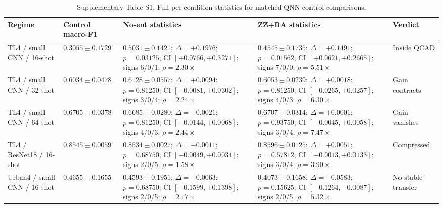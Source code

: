 \begin{table}[!t]
\centering
\scriptsize
\caption{Supplementary Table S1. Full per-condition statistics for matched QNN-control comparisons.}
\label{tab:supp_full_stats}
\setlength{\tabcolsep}{2.5pt}
\renewcommand{\arraystretch}{1.12}
\begin{tabular}{@{}p{}p{}p{}p{}p{}@{}}
\toprule
Regime & Control macro-F1 & No-ent statistics & ZZ+RA statistics & Verdict \\
\midrule
TL4 / small CNN / 16-shot & $0.3055\pm0.1729$ & $0.5031\pm0.1421$; $\Delta=+0.1976$; $p=0.03125$; CI $[+0.0766,+0.3271]$; signs 6/0/1; $\rho=2.30\times$ & $0.4545\pm0.1735$; $\Delta=+0.1491$; $p=0.01562$; CI $[+0.0621,+0.2665]$; signs 7/0/0; $\rho=5.51\times$ & Inside QCAD \\
TL4 / small CNN / 32-shot & $0.6034\pm0.0478$ & $0.6128\pm0.0557$; $\Delta=+0.0094$; $p=0.81250$; CI $[-0.0081,+0.0302]$; signs 3/0/4; $\rho=2.24\times$ & $0.6053\pm0.0239$; $\Delta=+0.0018$; $p=0.81250$; CI $[-0.0265,+0.0257]$; signs 4/0/3; $\rho=6.30\times$ & Gain contracts \\
TL4 / small CNN / 64-shot & $0.6705\pm0.0378$ & $0.6685\pm0.0280$; $\Delta=-0.0021$; $p=0.81250$; CI $[-0.0144,+0.0068]$; signs 4/0/3; $\rho=2.44\times$ & $0.6707\pm0.0314$; $\Delta=+0.0001$; $p=0.93750$; CI $[-0.0045,+0.0058]$; signs 3/0/4; $\rho=7.47\times$ & Gain vanishes \\
TL4 / ResNet18 / 16-shot & $0.8545\pm0.0059$ & $0.8534\pm0.0027$; $\Delta=-0.0011$; $p=0.68750$; CI $[-0.0049,+0.0034]$; signs 2/0/5; $\rho=1.58\times$ & $0.8596\pm0.0125$; $\Delta=+0.0051$; $p=0.57812$; CI $[-0.0013,+0.0133]$; signs 3/0/4; $\rho=3.90\times$ & Compressed \\
Urban4 / small CNN / 16-shot & $0.4655\pm0.1655$ & $0.4593\pm0.1951$; $\Delta=-0.0063$; $p=0.68750$; CI $[-0.1599,+0.1398]$; signs 2/0/5; $\rho=2.17\times$ & $0.4073\pm0.1658$; $\Delta=-0.0583$; $p=0.15625$; CI $[-0.1264,-0.0087]$; signs 2/0/5; $\rho=5.32\times$ & No stable transfer \\
\bottomrule
\end{tabular}
\end{table}
